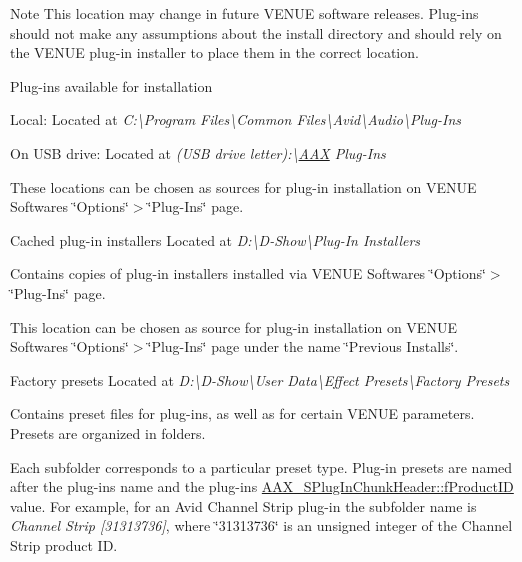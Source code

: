  \begin{DoxyNote}{Note}
This location may change in future V\+E\+N\+UE software releases. Plug-\/ins should not make any assumptions about the install directory and should rely on the V\+E\+N\+UE plug-\/in installer to place them in the correct location.
\end{DoxyNote}
Plug-\/ins available for installation 
\begin{DoxyItemize}
\item Local\+: Located at {\itshape C\+:\textbackslash{}Program Files\textbackslash{}Common Files\textbackslash{}Avid\textbackslash{}Audio\textbackslash{}Plug-\/\+Ins}  
\item On U\+SB drive\+: Located at {\itshape (U\+SB drive letter)\+:\textbackslash{}\mbox{\hyperlink{a00852}{A\+AX}} Plug-\/\+Ins}  
\end{DoxyItemize}

 These locations can be chosen as sources for plug-\/in installation on V\+E\+N\+UE Software\textquotesingle{}s \char`\"{}\+Options\char`\"{}$>$\char`\"{}\+Plug-\/\+Ins\char`\"{} page.

 Cached plug-\/in installers Located at {\itshape D\+:\textbackslash{}D-\/\+Show\textbackslash{}Plug-\/\+In Installers}

 Contains copies of plug-\/in installers installed via V\+E\+N\+UE Software\textquotesingle{}s \char`\"{}\+Options\char`\"{}$>$\char`\"{}\+Plug-\/\+Ins\char`\"{} page.

 This location can be chosen as source for plug-\/in installation on V\+E\+N\+UE Software\textquotesingle{}s \char`\"{}\+Options\char`\"{}$>$\char`\"{}\+Plug-\/\+Ins\char`\"{} page under the name \char`\"{}\+Previous Installs\char`\"{}.

 Factory presets Located at {\itshape D\+:\textbackslash{}D-\/\+Show\textbackslash{}User Data\textbackslash{}Effect Presets\textbackslash{}Factory Presets}

 Contains preset files for plug-\/ins, as well as for certain V\+E\+N\+UE parameters. Presets are organized in folders.

 Each subfolder corresponds to a particular preset type. Plug-\/in presets are named after the plug-\/in\textquotesingle{}s name and the plug-\/in\textquotesingle{}s \mbox{\hyperlink{a01417_afbed1db12ae1f7cb3204dad3fd66070e}{A\+A\+X\+\_\+\+S\+Plug\+In\+Chunk\+Header\+::f\+Product\+ID}} value. For example, for an Avid Channel Strip plug-\/in the subfolder name is {\itshape Channel Strip \mbox{[}31313736\mbox{]}}, where \char`\"{}31313736\char`\"{} is an unsigned integer of the Channel Strip product ID.

